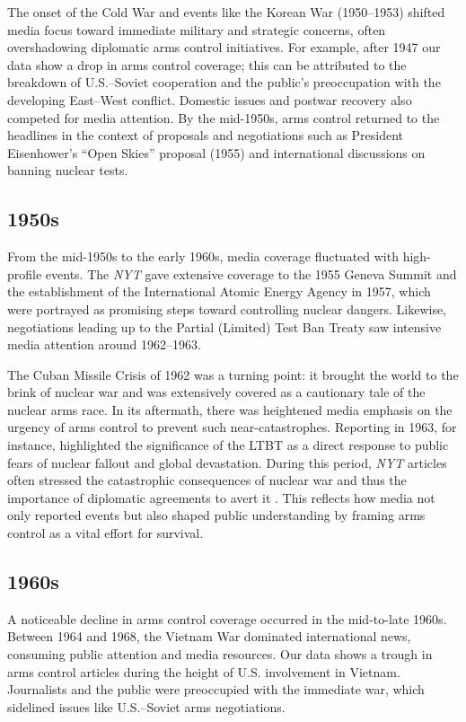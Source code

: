 \documentclass[11,5 pt]{article}
\begin{document}
    The onset of the Cold War and events like the Korean War (1950–1953) shifted media focus toward immediate military and strategic concerns, often overshadowing diplomatic arms control initiatives. For example, after 1947 our data show a drop in arms control coverage; this can be attributed to the breakdown of U.S.–Soviet cooperation and the public’s preoccupation with the developing East–West conflict. Domestic issues and postwar recovery also competed for media attention. By the mid-1950s, arms control returned to the headlines in the context of proposals and negotiations such as President Eisenhower’s “Open Skies” proposal (1955) and international discussions on banning nuclear tests.
    

\subsection*{1950s}
    
    From the mid-1950s to the early 1960s, media coverage fluctuated with high-profile events. The \textit{NYT} gave extensive coverage to the 1955 Geneva Summit and the establishment of the International Atomic Energy Agency in 1957, which were portrayed as promising steps toward controlling nuclear dangers. Likewise, negotiations leading up to the Partial (Limited) Test Ban Treaty saw intensive media attention around 1962–1963. 
    
    The Cuban Missile Crisis of 1962 was a turning point: it brought the world to the brink of nuclear war and was extensively covered as a cautionary tale of the nuclear arms race. In its aftermath, there was heightened media emphasis on the urgency of arms control to prevent such near-catastrophes. Reporting in 1963, for instance, highlighted the significance of the LTBT as a direct response to public fears of nuclear fallout and global devastation. During this period, \textit{NYT} articles often stressed the catastrophic consequences of nuclear war and thus the importance of diplomatic agreements to avert it \cite{Dorman1988}. This reflects how media not only reported events but also shaped public understanding by framing arms control as a vital effort for survival.
    

\subsection*{1960s}

    A noticeable decline in arms control coverage occurred in the mid-to-late 1960s. Between 1964 and 1968, the Vietnam War dominated international news, consuming public attention and media resources. Our data shows a trough in arms control articles during the height of U.S. involvement in Vietnam. Journalists and the public were preoccupied with the immediate war, which sidelined issues like U.S.–Soviet arms negotiations. 
    
\end{document}
